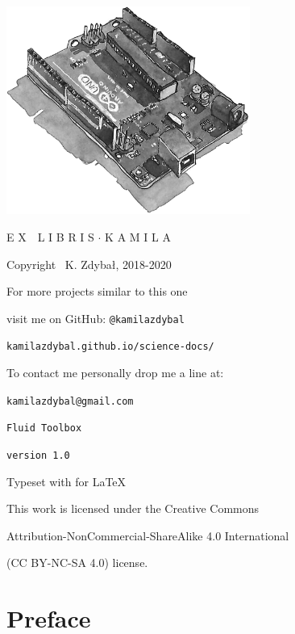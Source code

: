 \documentclass[10pt]{report}
\begin{document}
\thispagestyle{empty}
\begin{center}
\vspace*{3cm}
\includegraphics[width = 80mm]{ex_libris_arduino.jpg}

\vspace*{1cm}

{\fontsize{18}{10}\selectfont {}\selectfont E X \,\, L I B R I S $\cdotp$ K A M I L A}

\vspace*{2cm}

Copyright \textcopyright \, K. Zdybał, 2018-2020

For more projects similar to this one

visit me on GitHub: \verb|@kamilazdybal|

\verb|kamilazdybal.github.io/science-docs/|

To contact me personally drop me a line at:

\verb|kamilazdybal@gmail.com|

\vspace*{2cm}

\verb|Fluid Toolbox|

\verb|version 1.0|

Typeset with  for \LaTeX

\vspace*{1.8cm}

\noindent This work is licensed under the Creative Commons

Attribution-NonCommercial-ShareAlike 4.0 International 

(CC BY-NC-SA
4.0) license.
\end{center}

\setlength{\parskip}{0.6em}
\setlength{\parindent}{0cm}

\tableofcontents
\chapter*{Preface}
\thispagestyle{empty}
\end{document}
